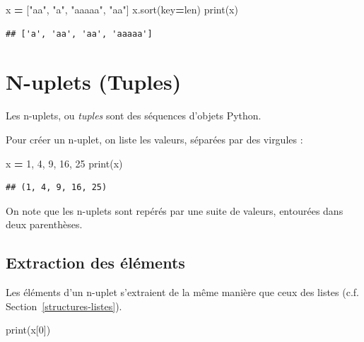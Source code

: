 \documentclass[12pt,]{book}
\newenvironment{Shaded}{\begin{snugshade}}{\end{snugshade}}
\newcommand{\DecValTok}[1]{\textcolor[rgb]{0.00,0.00,0.81}{#1}}
\newcommand{\StringTok}[1]{\textcolor[rgb]{0.31,0.60,0.02}{#1}}
\newcommand{\OperatorTok}[1]{\textcolor[rgb]{0.81,0.36,0.00}{\textbf{#1}}}
\newcommand{\BuiltInTok}[1]{#1}
\newcommand{\NormalTok}[1]{#1}
\numberwithin{equation}{section}
\numberwithin{countremarque}{section}
\begin{document}
\begin{Shaded}
\begin{Highlighting}[]
\NormalTok{x }\OperatorTok{=}\NormalTok{ [}\StringTok{"aa"}\NormalTok{, }\StringTok{"a"}\NormalTok{, }\StringTok{"aaaaa"}\NormalTok{, }\StringTok{"aa"}\NormalTok{]}
\NormalTok{x.sort(key}\OperatorTok{=}\BuiltInTok{len}\NormalTok{)}
\BuiltInTok{print}\NormalTok{(x)}
\end{Highlighting}
\end{Shaded}

\begin{lstlisting}
## ['a', 'aa', 'aa', 'aaaaa']
\end{lstlisting}

\section{N-uplets (Tuples)}\label{n-uplets-tuples}

Les n-uplets, ou \emph{tuples} sont des séquences d'objets Python.

Pour créer un n-uplet, on liste les valeurs, séparées par des virgules :

\begin{Shaded}
\begin{Highlighting}[]
\NormalTok{x }\OperatorTok{=} \DecValTok{1}\NormalTok{, }\DecValTok{4}\NormalTok{, }\DecValTok{9}\NormalTok{, }\DecValTok{16}\NormalTok{, }\DecValTok{25}
\BuiltInTok{print}\NormalTok{(x)}
\end{Highlighting}
\end{Shaded}

\begin{lstlisting}
## (1, 4, 9, 16, 25)
\end{lstlisting}

On note que les n-uplets sont repérés par une suite de valeurs,
entourées dans deux parenthèses.

\subsection{Extraction des éléments}\label{extraction-des-elements}

Les éléments d'un n-uplet s'extraient de la même manière que ceux des
listes (c.f. Section~\ref{structures-listes}).

\begin{Shaded}
\begin{Highlighting}[]
\BuiltInTok{print}\NormalTok{(x[}\DecValTok{0}\NormalTok{])}
\end{Highlighting}
\end{Shaded}
\end{document}
